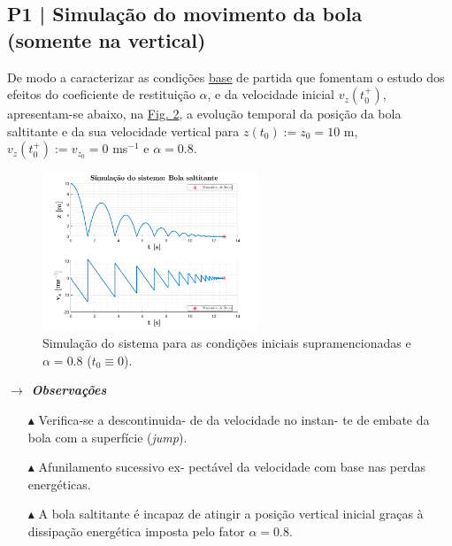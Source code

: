 \clearpage

\def\testeimplies{\mathrel{\ensurestackMath{\stackon[1pt]{\implies}{\scriptstyle t_0 \equiv 0}}}}
\def\testeimpliess{\mathrel{\ensurestackMath{\stackon[1pt]{\implies}{\scriptstyle v_z(t_1^-) < 0}}}}
\subsection{P1 | Simulação do movimento da bola (somente na vertical)}
\label{subsec:P1}

De modo a caracterizar as condições \underline{base} de partida que fomentam o estudo dos efeitos do coeficiente de restituição $\alpha$, e da velocidade inicial $v_z(t_0^+)$, apresentam-se abaixo, na \hyperref[fig:P1-SistemaCompleto]{Fig. 2}, a evolução temporal da posição da bola saltitante e da sua velocidade vertical para $z(t_0) := z_0 = 10$ m, $v_{z}(t_0^+) := v_{z_0} = 0$ ms$^{-1}$ e $\alpha = 0.8$. 

\begin{figure}
    \centering
    \includegraphics[width=0.575\textwidth]{img/P1/P1-SistemaCompleto.png}
    \caption{Simulação do sistema para as condições iniciais supramencionadas e $\alpha = 0.8$ ($t_0 \equiv 0$).}
    \label{fig:P1-SistemaCompleto}
\end{figure}

\vphantom{123}

\noindent\textbf{\textit{$\rightarrow$ Observações}}
\vspace{-0.5em}
\begin{itemize}
    \item[$\blacktriangle$] Verifica-se a descontinuida- de da velocidade no instan- te de embate da bola com a superfície (\textit{jump})\protect\footnotemark[3].
    
    \item[$\blacktriangle$] Afunilamento sucessivo ex- pectável da velocidade com base nas perdas energéticas.
    
    \item[$\blacktriangle$] A bola saltitante é incapaz de atingir a posição vertical inicial graças à dissipação energética imposta pelo fator $\alpha = 0.8$.
\end{itemize}


